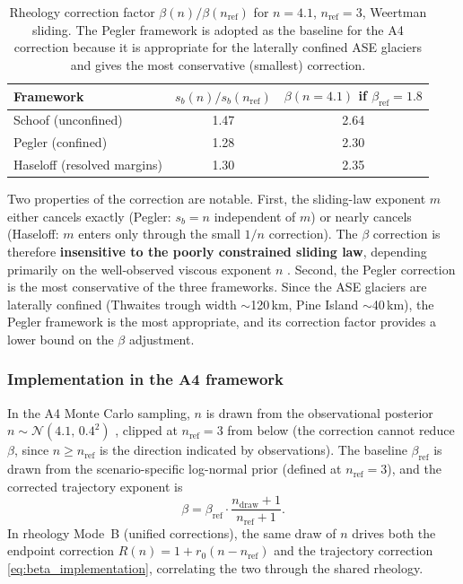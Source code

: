 \documentclass[11pt]{article}
\begin{document}
\begin{table}[ht]
\centering
\caption{Rheology correction factor $\beta(n)/\beta(n_{\mathrm{ref}})$ for $n = 4.1$, $n_{\mathrm{ref}} = 3$, Weertman sliding. The Pegler framework is adopted as the baseline for the A4 correction because it is appropriate for the laterally confined ASE glaciers and gives the most conservative (smallest) correction.}
\label{tab:beta_correction}
\smallskip
\begin{tabular}{l c c}
\toprule
Framework & $s_b(n)/s_b(n_{\mathrm{ref}})$ & $\beta(n{=}4.1)$ if $\beta_{\mathrm{ref}} = 1.8$ \\
\midrule
Schoof (unconfined) & 1.47 & 2.64 \\
Pegler (confined) & 1.28 & 2.30 \\
Haseloff (resolved margins) & 1.30 & 2.35 \\
\bottomrule
\end{tabular}
\end{table}

Two properties of the correction are notable. First, the sliding-law exponent $m$ either cancels exactly (Pegler: $s_b = n$ independent of $m$) or nearly cancels (Haseloff: $m$ enters only through the small $1/n$ correction). The $\beta$ correction is therefore \textbf{insensitive to the poorly constrained sliding law}, depending primarily on the well-observed viscous exponent $n$ \citep{Millstein2022}. Second, the Pegler correction is the most conservative of the three frameworks. Since the ASE glaciers are laterally confined (Thwaites trough width $\sim$120\,km, Pine Island $\sim$40\,km), the Pegler framework is the most appropriate, and its correction factor provides a lower bound on the $\beta$ adjustment.

\subsubsection{Implementation in the A4 framework}

In the A4 Monte Carlo sampling, $n$ is drawn from the observational posterior $n \sim \mathcal{N}(4.1,\, 0.4^2)$ \citep{Millstein2022}, clipped at $n_{\mathrm{ref}} = 3$ from below (the correction cannot reduce $\beta$, since $n \geq n_{\mathrm{ref}}$ is the direction indicated by observations). The baseline $\beta_{\mathrm{ref}}$ is drawn from the scenario-specific log-normal prior (defined at $n_{\mathrm{ref}} = 3$), and the corrected trajectory exponent is
\begin{equation}
	\beta = \beta_{\mathrm{ref}} \cdot \frac{n_{\mathrm{draw}} + 1}{n_{\mathrm{ref}} + 1}.
	\label{eq:beta_implementation}
\end{equation}
In rheology Mode~B (unified corrections), the same draw of $n$ drives both the endpoint correction $R(n) = 1 + r_0(n - n_{\mathrm{ref}})$ and the trajectory correction \cref{eq:beta_implementation}, correlating the two through the shared rheology.
\end{document}
